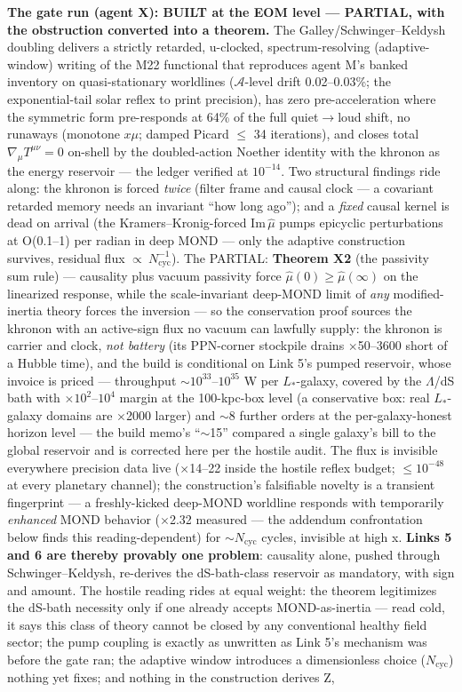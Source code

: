\documentclass[11pt,a4paper]{article}
\begin{document}
\textbf{The gate run (agent X): BUILT at the EOM level --- PARTIAL, with the obstruction converted into a theorem.} The Galley/Schwinger--Keldysh doubling delivers a strictly retarded, u-clocked, spectrum-resolving (adaptive-window) writing of the M22 functional that reproduces agent M's banked inventory on quasi-stationary worldlines ($\mathcal{A}$-level drift 0.02--0.03\%; the exponential-tail solar reflex to print precision), has zero pre-acceleration where the symmetric form pre-responds at 64\% of the full quiet$\to$loud shift, no runaways (monotone $x\mu$; damped Picard $\le$ 34 iterations), and closes total $\nabla_\mu T^{\mu\nu} = 0$ on-shell by the doubled-action Noether identity with the khronon as the energy reservoir --- the ledger verified at $10^{-14}$. Two structural findings ride along: the khronon is forced \emph{twice} (filter frame and causal clock --- a covariant retarded memory needs an invariant ``how long ago''); and a \emph{fixed} causal kernel is dead on arrival (the Kramers--Kronig-forced $\mathrm{Im}\,\hat\mu$ pumps epicyclic perturbations at O(0.1--1) per radian in deep MOND --- only the adaptive construction survives, residual flux $\propto\ N_{\mathrm{cyc}}^{-1}$). The PARTIAL: \textbf{Theorem X2} (the passivity sum rule) --- causality plus vacuum passivity force $\hat\mu(0) \ge \hat\mu(\infty)$ on the linearized response, while the scale-invariant deep-MOND limit of \emph{any} modified-inertia theory forces the inversion --- so the conservation proof sources the khronon with an active-sign flux no vacuum can lawfully supply: the khronon is carrier and clock, \emph{not battery} (its PPN-corner stockpile drains $\times$50--3600 short of a Hubble time), and the build is conditional on Link 5's pumped reservoir, whose invoice is priced --- throughput $\sim{}10^{33}$--$10^{35}$ W per $L_\ast$-galaxy, covered by the $\Lambda$/dS bath with $\times10^{2}$--$10^{4}$ margin at the 100-kpc-box level (a conservative box: real $L_\ast$-galaxy domains are $\times$2000 larger) and $\sim$8 further orders at the per-galaxy-honest horizon level --- the build memo's ``$\sim$15'' compared a single galaxy's bill to the global reservoir and is corrected here per the hostile audit. The flux is invisible everywhere precision data live ($\times$14--22 inside the hostile reflex budget; $\le{}10^{-48}$ at every planetary channel); the construction's falsifiable novelty is a transient fingerprint --- a freshly-kicked deep-MOND worldline responds with temporarily \emph{enhanced} MOND behavior ($\times$2.32 measured --- the addendum confrontation below finds this reading-dependent) for $\sim{}N_{\mathrm{cyc}}$ cycles, invisible at high x. \textbf{Links 5 and 6 are thereby provably one problem}: causality alone, pushed through Schwinger--Keldysh, re-derives the dS-bath-class reservoir as mandatory, with sign and amount. The hostile reading rides at equal weight: the theorem legitimizes the dS-bath necessity only if one already accepts MOND-as-inertia --- read cold, it says this class of theory cannot be closed by any conventional healthy field sector; the pump coupling is exactly as unwritten as Link 5's mechanism was before the gate ran; the adaptive window introduces a dimensionless choice ($N_{\mathrm{cyc}}$) nothing yet fixes; and nothing in the construction derives Z, 
\end{document}
